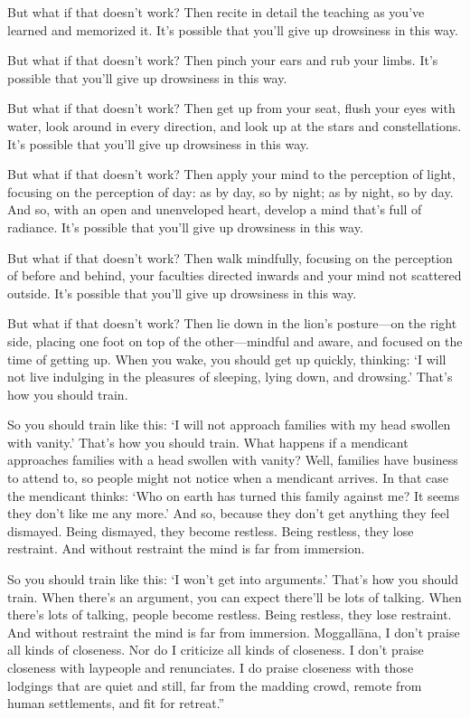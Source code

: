 \documentclass[12pt,openany]{book}%
\begin{document}
But what if that doesn’t work? Then recite in detail the teaching as you’ve learned and memorized it. It’s possible that you’ll give up drowsiness in this way. 

But what if that doesn’t work? Then pinch your ears and rub your limbs. It’s possible that you’ll give up drowsiness in this way. 

But what if that doesn’t work? Then get up from your seat, flush your eyes with water, look around in every direction, and look up at the stars and constellations. It’s possible that you’ll give up drowsiness in this way. 

But what if that doesn’t work? Then apply your mind to the perception of light, focusing on the perception of day: as by day, so by night; as by night, so by day. And so, with an open and unenveloped heart, develop a mind that’s full of radiance. It’s possible that you’ll give up drowsiness in this way. 

But what if that doesn’t work? Then walk mindfully, focusing on the perception of before and behind, your faculties directed inwards and your mind not scattered outside. It’s possible that you’ll give up drowsiness in this way. 

But what if that doesn’t work? Then lie down in the lion’s posture—on the right side, placing one foot on top of the other—mindful and aware, and focused on the time of getting up. When you wake, you should get up quickly, thinking: ‘I will not live indulging in the pleasures of sleeping, lying down, and drowsing.’ That’s how you should train. 

So you should train like this: ‘I will not approach families with my head swollen with vanity.’ That’s how you should train. What happens if a mendicant approaches families with a head swollen with vanity? Well, families have business to attend to, so people might not notice when a mendicant arrives. In that case the mendicant thinks: ‘Who on earth has turned this family against me? It seems they don’t like me any more.’ And so, because they don’t get anything they feel dismayed. Being dismayed, they become restless. Being restless, they lose restraint. And without restraint the mind is far from immersion. 

So you should train like this: ‘I won’t get into arguments.’ That’s how you should train. When there’s an argument, you can expect there’ll be lots of talking. When there’s lots of talking, people become restless. Being restless, they lose restraint. And without restraint the mind is far from immersion. \textsanskrit{Moggallāna}, I don’t praise all kinds of closeness. Nor do I criticize all kinds of closeness. I don’t praise closeness with laypeople and renunciates. I do praise closeness with those lodgings that are quiet and still, far from the madding crowd, remote from human settlements, and fit for retreat.” 
\end{document}
